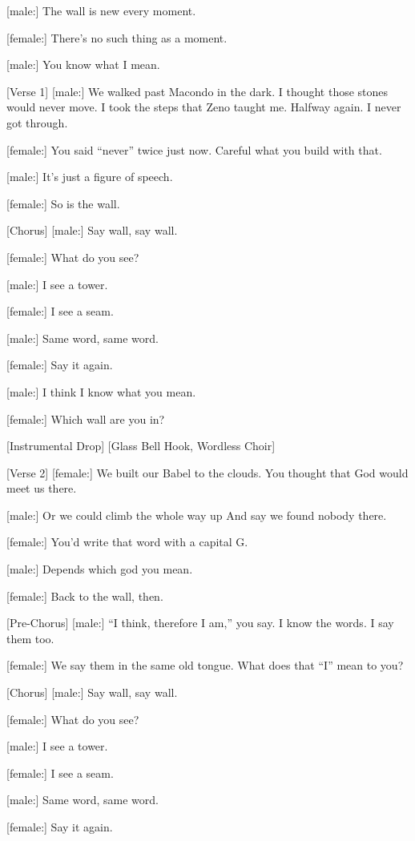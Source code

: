 \begin{lyrics}

[male:]
The wall is new every moment.

[female:]
There’s no such thing as a moment.

[male:]
You know what I mean.

[Verse 1]
[male:]
We walked past Macondo in the dark.
I thought those stones would never move.
I took the steps that Zeno taught me.
Halfway again. I never got through.

[female:]
You said “never” twice just now.
Careful what you build with that.

[male:]
It’s just a figure of speech.

[female:]
So is the wall.

[Chorus]
[male:]
Say wall, say wall.

[female:]
What do you see?

[male:]
I see a tower.

[female:]
I see a seam.

[male:]
Same word, same word.

[female:]
Say it again.

[male:]
I think I know what you mean.

[female:]
Which wall are you in?

[Instrumental Drop]
[Glass Bell Hook, Wordless Choir]

[Verse 2]
[female:]
We built our Babel to the clouds.
You thought that God would meet us there.

[male:]
Or we could climb the whole way up
And say we found nobody there.

[female:]
You’d write that word with a capital G.

[male:]
Depends which god you mean.

[female:]
Back to the wall, then.

[Pre-Chorus]
[male:]
“I think, therefore I am,” you say.
I know the words. I say them too.

[female:]
We say them in the same old tongue.
What does that “I” mean to you?

[Chorus]
[male:]
Say wall, say wall.

[female:]
What do you see?

[male:]
I see a tower.

[female:]
I see a seam.

[male:]
Same word, same word.

[female:]
Say it again.


\end{lyrics}
